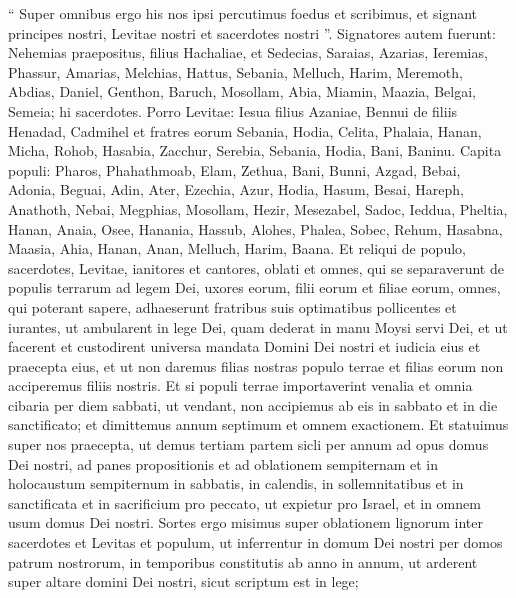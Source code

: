 \begin{biblechapter}
\begin{biblechapter}
\begin{biblechapter}
\begin{biblechapter}
\begin{biblechapter}
\begin{biblechapter}
\begin{biblechapter}
\begin{biblechapter}
\begin{biblechapter}
\begin{biblechapter}
\verse “ Super omnibus ergo his nos ipsi percutimus foedus et scribimus, et signant principes nostri, Levitae nostri et sacerdotes nostri ”.
 \verse Signatores autem fuerunt: Nehemias praepositus, filius Hachaliae, et Sedecias, 
\verse Saraias, Azarias, Ieremias, 
\verse Phassur, Amarias, Melchias, 
\verse Hattus, Sebania, Melluch, 
\verse Harim, Meremoth, Abdias, 
\verse Daniel, Genthon, Baruch, 
\verse Mosollam, Abia, Miamin, 
\verse Maazia, Belgai, Semeia; hi sacerdotes. 
\verse Porro Levitae: Iesua filius Azaniae, Bennui de filiis Henadad, Cadmihel 
\verse et fratres eorum Sebania, Hodia, Celita, Phalaia, Hanan, 
\verse Micha, Rohob, Hasabia, 
\verse Zacchur, Serebia, Sebania, 
\verse Hodia, Bani, Baninu.
 \verse Capita populi: Pharos, Phahathmoab, Elam, Zethua, Bani, 
\verse Bunni, Azgad, Bebai, 
\verse Adonia, Beguai, Adin, 
\verse Ater, Ezechia, Azur, 
\verse Hodia, Hasum, Besai, 
\verse Hareph, Anathoth, Nebai, 
\verse Megphias, Mosollam, Hezir, 
\verse Mesezabel, Sadoc, Ieddua, 
\verse Pheltia, Hanan, Anaia, 
\verse Osee, Hanania, Hassub, 
\verse Alohes, Phalea, Sobec, 
\verse Rehum, Hasabna, Maasia, 
\verse Ahia, Hanan, Anan, 
\verse Melluch, Harim, Baana.
 \verse Et reliqui de populo, sacerdotes, Levitae, ianitores et cantores, oblati et omnes, qui se separaverunt de populis terrarum ad legem Dei, uxores eorum, filii eorum et filiae eorum, omnes, qui poterant sapere, 
\verse adhaeserunt fratribus suis optimatibus pollicentes et iurantes, ut ambularent in lege Dei, quam dederat in manu Moysi servi Dei, et ut facerent et custodirent universa mandata Domini Dei nostri et iudicia eius et praecepta eius, 
\verse et ut non daremus filias nostras populo terrae et filias eorum non acciperemus filiis nostris.
 \verse Et si populi terrae importaverint venalia et omnia cibaria per diem sabbati, ut vendant, non accipiemus ab eis in sabbato et in die sanctificato; et dimittemus annum septimum et omnem exactionem. 
\verse Et statuimus super nos praecepta, ut demus tertiam partem sicli per annum ad opus domus Dei nostri, 
 \verse ad panes propositionis et ad oblationem sempiternam et in holocaustum sempiternum in sabbatis, in calendis, in sollemnitatibus et in sanctificata et in sacrificium pro peccato, ut expietur pro Israel, et in omnem usum domus Dei nostri.
 \verse Sortes ergo misimus super oblationem lignorum inter sacerdotes et Levitas et populum, ut inferrentur in domum Dei nostri per domos patrum nostrorum, in temporibus constitutis ab anno in annum, ut arderent super altare domini Dei nostri, sicut scriptum est in lege; 

\end{biblechapter}
\end{biblechapter}
\end{biblechapter}
\end{biblechapter}
\end{biblechapter}
\end{biblechapter}
\end{biblechapter}
\end{biblechapter}
\end{biblechapter}
\end{biblechapter}
